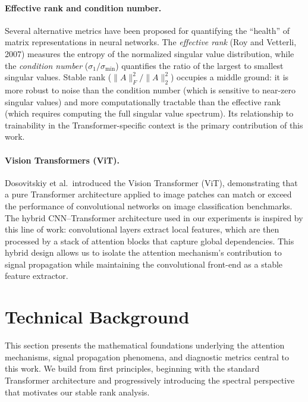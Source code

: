\documentclass[12pt, a4paper]{article}
\begin{document}
\paragraph{Effective rank and condition number.}
Several alternative metrics have been proposed for quantifying the
``health'' of matrix representations in neural networks. The
\textit{effective rank} (Roy and Vetterli, 2007) measures the entropy
of the normalized singular value distribution, while the
\textit{condition number} ($\sigma_1 / \sigma_{\min}$) quantifies the
ratio of the largest to smallest singular values. Stable rank
($\|A\|_F^2 / \|A\|_2^2$) occupies a middle ground: it is more robust
to noise than the condition number (which is sensitive to near-zero
singular values) and more computationally tractable than the effective
rank (which requires computing the full singular value
spectrum). Its relationship to trainability in the
Transformer-specific context is the primary contribution of this work.

\paragraph{Vision Transformers (ViT).}
Dosovitskiy et al.\ introduced the Vision Transformer (ViT), demonstrating
that a pure Transformer architecture applied to image patches can match
or exceed the performance of convolutional networks on image
classification benchmarks. The hybrid CNN--Transformer architecture used
in our experiments is inspired by this line of work: convolutional layers
extract local features, which are then processed by a stack of attention
blocks that capture global dependencies. This hybrid design allows us to
isolate the attention mechanism's contribution to signal propagation
while maintaining the convolutional front-end as a stable feature
extractor.

\section{Technical Background}

This section presents the mathematical foundations underlying the
attention mechanisms, signal propagation phenomena, and diagnostic
metrics central to this work. We build from first principles, beginning
with the standard Transformer architecture and progressively introducing
the spectral perspective that motivates our stable rank analysis.
\end{document}
